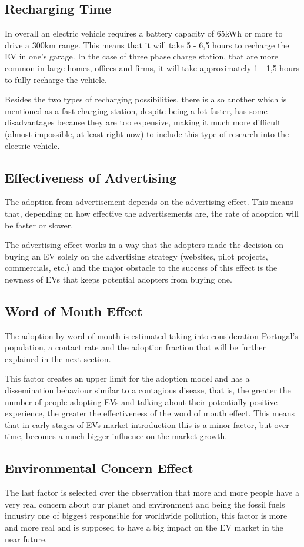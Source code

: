 \subsection{Recharging Time}
In overall an electric vehicle requires a battery capacity of 65kWh or more to drive a 300km range. This means that it will take 5 - 6,5 hours to recharge the EV in one's garage. In the case of three phase charge station, that are more common in large homes, offices and firms, it will take approximately 1 - 1,5 hours to fully recharge the vehicle.

Besides the two types of recharging possibilities, there is also another which is mentioned as a fast charging station, despite being a lot faster, has some disadvantages because they are too expensive, making it much more difficult (almost impossible, at least right now) to include this type of research into the electric vehicle.

\subsection{Effectiveness of Advertising}
The adoption from advertisement depends on the advertising effect. This means that, depending on how effective the advertisements are, the rate of adoption will be faster or slower.

The advertising effect works in a way that the adopters made the decision on buying an EV solely on the advertising strategy (websites, pilot projects, commercials, etc.) and the major obstacle to the success of this effect is the newness of EVs that keeps potential adopters from buying one.

\subsection{Word of Mouth Effect}
The adoption by word of mouth is estimated taking into consideration Portugal's population, a contact rate and the adoption fraction that will be further explained in the next section.

This factor creates an upper limit for the adoption model and has a dissemination behaviour similar to a contagious disease, that is, the greater the number of people adopting EVs and talking about their potentially positive experience, the greater the effectiveness of the word of mouth effect. This means that in early stages of EVs market introduction this is a minor factor, but over time, becomes a much bigger influence on the market growth.

\subsection{Environmental Concern Effect}
The last factor is selected over the observation that more and more people have a very real concern about our planet and environment and being the fossil fuels industry one of biggest responsible for worldwide pollution, this factor is more and more real and is supposed to have a big impact on the EV market in the near future.
